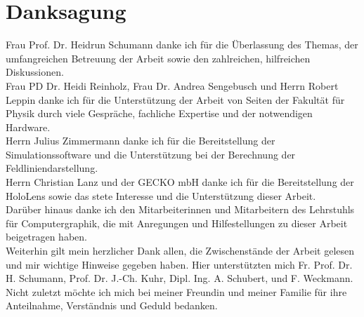 \section*{Danksagung}
Frau Prof. Dr. Heidrun Schumann danke ich für die Überlassung des Themas, der umfangreichen Betreuung der Arbeit sowie den zahlreichen, hilfreichen Diskussionen.\\

Frau PD Dr. Heidi Reinholz, Frau Dr. Andrea Sengebusch und Herrn Robert Leppin danke ich für die Unterstützung der Arbeit von Seiten der Fakultät für Physik durch viele Gespräche, fachliche Expertise und der notwendigen Hardware.\\

Herrn Julius Zimmermann danke ich für die Bereitstellung der Simulationssoftware und die Unterstützung bei der Berechnung der Feldliniendarstellung.\\

Herrn Christian Lanz und der GECKO mbH danke ich für die Bereitstellung der HoloLens sowie das stete Interesse und die Unterstützung dieser Arbeit.\\

Darüber hinaus danke ich den Mitarbeiterinnen und Mitarbeitern des Lehrstuhls für Computergraphik, die mit Anregungen und Hilfestellungen zu dieser Arbeit beigetragen haben.\\

Weiterhin gilt mein herzlicher Dank allen, die Zwischenstände der Arbeit gelesen und mir wichtige Hinweise gegeben haben. Hier unterstützten mich Fr. Prof. Dr. H. Schumann, Prof. Dr. J.-Ch. Kuhr, Dipl. Ing. A. Schubert, und F. Weckmann.\\

Nicht zuletzt möchte ich mich bei meiner Freundin und meiner Familie für ihre Anteilnahme, Verständnis und Geduld bedanken.